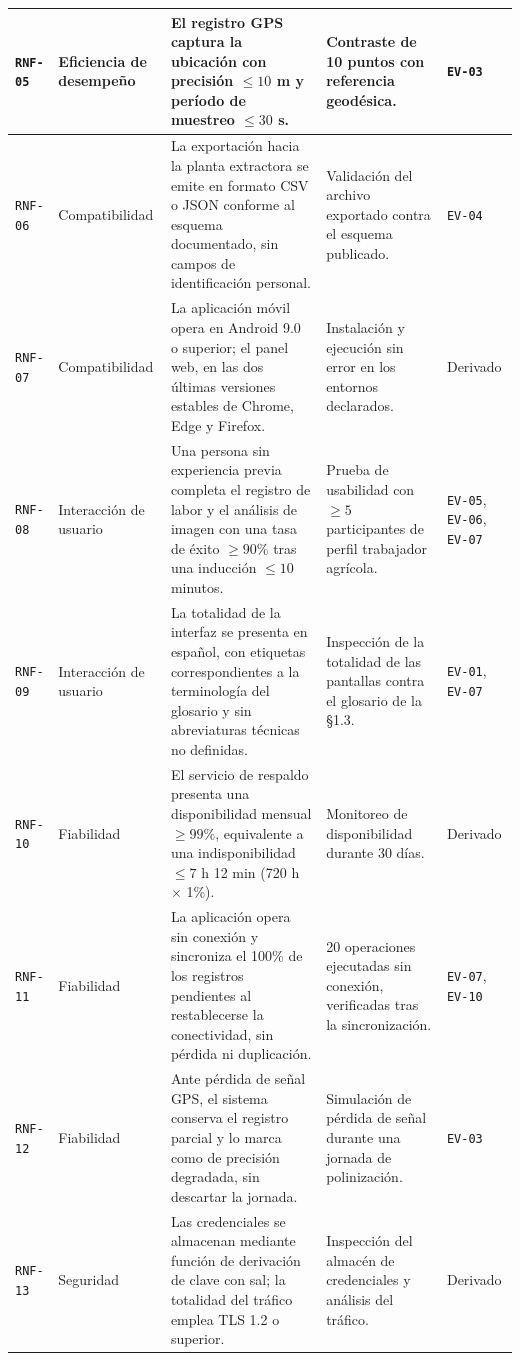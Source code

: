 \documentclass[11pt,a4paper]{article}
\newcommand{\id}[1]{\texttt{\begingroup\hyphenpenalty=10000\relax#1\endgroup}}
\renewcommand{\id}[1]{\texttt{#1}}
\begin{document}
{\begin{longtable}{|C{1.2cm}|L{2.4cm}|L{5.8cm}|L{3.1cm}|L{2.2cm}|}
\id{RNF-05} & Eficiencia de desempeño & El registro GPS captura la ubicación con precisión $\leq 10$ m y período de muestreo $\leq 30$ s. & Contraste de 10 puntos con referencia geodésica. & \footnotesize \id{EV-03} \\ \hline
\id{RNF-06} & Compatibilidad & La exportación hacia la planta extractora se emite en formato CSV o JSON conforme al esquema documentado, sin campos de identificación personal. & Validación del archivo exportado contra el esquema publicado. & \footnotesize \id{EV-04} \\ \hline
\id{RNF-07} & Compatibilidad & La aplicación móvil opera en Android 9.0 o superior; el panel web, en las dos últimas versiones estables de Chrome, Edge y Firefox. & Instalación y ejecución sin error en los entornos declarados. & \footnotesize Derivado \\ \hline
\id{RNF-08} & Interacción de usuario & Una persona sin experiencia previa completa el registro de labor y el análisis de imagen con una tasa de éxito $\geq 90\%$ tras una inducción $\leq 10$ minutos. & Prueba de usabilidad con $\geq 5$ participantes de perfil trabajador agrícola. & \id{EV-05}, \id{EV-06}, \id{EV-07} \\ \hline
\id{RNF-09} & Interacción de usuario & La totalidad de la interfaz se presenta en español, con etiquetas correspondientes a la terminología del glosario y sin abreviaturas técnicas no definidas. & Inspección de la totalidad de las pantallas contra el glosario de la §1.3. & \id{EV-01}, \id{EV-07} \\ \hline
\id{RNF-10} & Fiabilidad & El servicio de respaldo presenta una disponibilidad mensual $\geq 99\%$, equivalente a una indisponibilidad $\leq 7$ h 12 min (720 h $\times$ 1\%). & Monitoreo de disponibilidad durante 30 días. & \footnotesize Derivado \\ \hline
\id{RNF-11} & Fiabilidad & La aplicación opera sin conexión y sincroniza el 100\% de los registros pendientes al restablecerse la conectividad, sin pérdida ni duplicación. & 20 operaciones ejecutadas sin conexión, verificadas tras la sincronización. & \id{EV-07}, \id{EV-10} \\ \hline
\id{RNF-12} & Fiabilidad & Ante pérdida de señal GPS, el sistema conserva el registro parcial y lo marca como de precisión degradada, sin descartar la jornada. & Simulación de pérdida de señal durante una jornada de polinización. & \footnotesize \id{EV-03} \\ \hline
\id{RNF-13} & Seguridad & Las credenciales se almacenan mediante función de derivación de clave con sal; la totalidad del tráfico emplea TLS 1.2 o superior. & Inspección del almacén de credenciales y análisis del tráfico. & \footnotesize Derivado \\ \hline

\end{longtable}}
\end{document}
